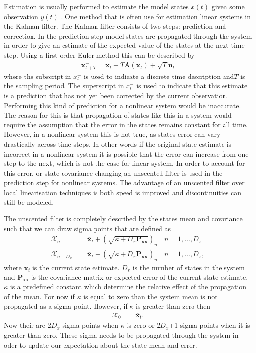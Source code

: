 Estimation is usually performed to estimate the model states $x(t)$ given some observation $y(t)$ . One method that is often use for estimation linear systems in the Kalman filter. The Kalman filter consists of two steps: prediction and correction. In the prediction step model states are propagated through the system in order to give an estimate of the expected value of the states at the next time step. Using a first order Euler method this can be described by \begin{align}
\mathbf{x}_{t+T}^{-} = \mathbf{x}_{t} + T\mathbf{A}(\mathbf{x}_{t}) +\sqrt{T}\mathbf{n}_{t}
\end{align} where the subscript in $x_{t}^{-}$ is used to indicate a discrete time description and$T$ is the sampling period. The superscript in $x_{t}^{-}$ is used to indicate that this estimate is a prediction that has not yet been corrected by the current observation. Performing this kind of prediction for a nonlinear system would be inaccurate. The reason for this is that propagation of states like this in a system would require the assumption that the error in the states remains constant for all time. However, in a nonlinear system this is not true, as states error can vary drastically across time steps. In other words if the original state estimate is incorrect in a nonlinear system it is possible that the error can increase from one step to the next, which is not the case for  linear system. In order to account for this error, or state covariance changing an unscented filter is used in the prediction step for nonlinear systems. The advantage of an unscented filter over local linearisation techniques is both speed is improved and discontinuities can still be modeled. 

The unscented filter is completely described by the states mean and covariance such that we can draw sigma points that are defined as  \begin{align}
\label{eqn: Unscented_Transform1}
\mathbf{\mathcal{X}}_{n} &= \mathbf{\overline{x}}_{t} + (\sqrt{\kappa+D_{x}\mathbf{P_{xx}}})_{n} \quad n=1,\hdots,D_x\\
\label{eqn: Unscented_Transform2}
\mathbf{\mathcal{X}}_{n+D_{x}} &= \mathbf{\overline{x}}_{t} - (\sqrt{\kappa+D_{x}\mathbf{P_{xx}}})_{n} \quad n=1,\hdots,D_x,
\end{align} where $\mathbf{\overline{x}}_{t}$ is the current state estimate. $D_{x}$ is the number of states in the system and $\mathbf{P_{xx}}$ is the covariance matrix or expected error of the current state estimate. $\kappa$ is a predefined constant which determine the relative effect of the propagation of the mean. For now if $\kappa$ is equal to zero than the system mean is not propagated as a sigma point. However, if $\kappa$ is greater than zero then \begin{align}
\mathbf{\mathcal{X}}_{0} &= \mathbf{\overline{x}}_{t}.
\end{align} Now their are 2$D_{x}$ sigma points when $\kappa$ is zero or 2$D_{x}$+1 sigma points when it is greater than zero. These sigma needs to be propagated through the system in oder to update our expectation about the state mean and error. 


